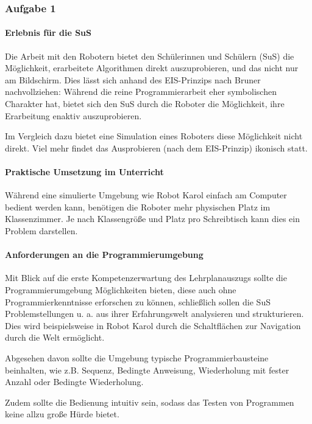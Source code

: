 \subsubsection{Aufgabe 1}
\paragraph{Erlebnis für die SuS}
Die Arbeit mit den Robotern bietet den Schülerinnen und Schülern (SuS) die
Möglichkeit, erarbeitete Algorithmen direkt auszuprobieren, und das nicht nur am
Bildschirm. Dies lässt sich anhand des EIS-Prinzips nach Bruner nachvollziehen:
Während die reine Programmierarbeit eher symbolischen Charakter hat, bietet sich
den SuS durch die Roboter die Möglichkeit, ihre Erarbeitung enaktiv
auszuprobieren.

Im Vergleich dazu bietet eine Simulation eines Roboters diese Möglichkeit nicht
direkt. Viel mehr findet das Ausprobieren (nach dem EIS-Prinzip) ikonisch statt.
\par
\paragraph{Praktische Umsetzung im Unterricht}
Während eine simulierte Umgebung wie Robot Karol einfach am Computer bedient
werden kann, benötigen die Roboter mehr physischen Platz im Klassenzimmer. Je
nach Klassengröße und Platz pro Schreibtisch kann dies ein Problem darstellen.
\par
\paragraph{Anforderungen an die Programmierumgebung}
Mit Blick auf die erste Kompetenzerwartung des Lehrplanauszugs sollte die
Programmierumgebung Möglichkeiten bieten, diese auch ohne Programmierkenntnisse
erforschen zu können, schließlich sollen die SuS Problemstellungen u. a. aus
ihrer Erfahrungswelt analysieren und strukturieren. Dies wird beispielsweise in
Robot Karol durch die Schaltflächen zur Navigation durch die Welt ermöglicht.

Abgesehen davon sollte die Umgebung typische Programmierbausteine beinhalten,
wie z.B. Sequenz, Bedingte Anweisung, Wiederholung mit fester Anzahl oder
Bedingte Wiederholung.

Zudem sollte die Bedienung intuitiv sein, sodass das Testen von Programmen keine
allzu große Hürde bietet.
\par

